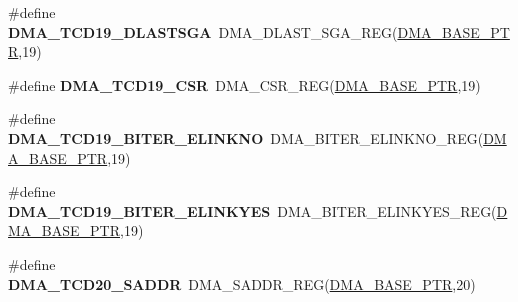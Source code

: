 \begin{DoxyCompactItemize}
\item 
\hypertarget{group___d_m_a___register___accessor___macros_gaef546aa07a3f2cf8190f304e29427477}{}\#define {\bfseries D\+M\+A\+\_\+\+T\+C\+D19\+\_\+\+D\+L\+A\+S\+T\+S\+G\+A}~D\+M\+A\+\_\+\+D\+L\+A\+S\+T\+\_\+\+S\+G\+A\+\_\+\+R\+E\+G(\hyperlink{group___d_m_a___peripheral_ga6997fbc1b1973e9f27170217a3bd6f22}{D\+M\+A\+\_\+\+B\+A\+S\+E\+\_\+\+P\+T\+R},19)\label{group___d_m_a___register___accessor___macros_gaef546aa07a3f2cf8190f304e29427477}

\item 
\hypertarget{group___d_m_a___register___accessor___macros_ga587a43ec991d2d01556bc6518886f92d}{}\#define {\bfseries D\+M\+A\+\_\+\+T\+C\+D19\+\_\+\+C\+S\+R}~D\+M\+A\+\_\+\+C\+S\+R\+\_\+\+R\+E\+G(\hyperlink{group___d_m_a___peripheral_ga6997fbc1b1973e9f27170217a3bd6f22}{D\+M\+A\+\_\+\+B\+A\+S\+E\+\_\+\+P\+T\+R},19)\label{group___d_m_a___register___accessor___macros_ga587a43ec991d2d01556bc6518886f92d}

\item 
\hypertarget{group___d_m_a___register___accessor___macros_gaa2f676b756e3847cfaea84b9b3f89f9d}{}\#define {\bfseries D\+M\+A\+\_\+\+T\+C\+D19\+\_\+\+B\+I\+T\+E\+R\+\_\+\+E\+L\+I\+N\+K\+N\+O}~D\+M\+A\+\_\+\+B\+I\+T\+E\+R\+\_\+\+E\+L\+I\+N\+K\+N\+O\+\_\+\+R\+E\+G(\hyperlink{group___d_m_a___peripheral_ga6997fbc1b1973e9f27170217a3bd6f22}{D\+M\+A\+\_\+\+B\+A\+S\+E\+\_\+\+P\+T\+R},19)\label{group___d_m_a___register___accessor___macros_gaa2f676b756e3847cfaea84b9b3f89f9d}

\item 
\hypertarget{group___d_m_a___register___accessor___macros_ga9a44cb006e77af05a3141fb2825aaf7a}{}\#define {\bfseries D\+M\+A\+\_\+\+T\+C\+D19\+\_\+\+B\+I\+T\+E\+R\+\_\+\+E\+L\+I\+N\+K\+Y\+E\+S}~D\+M\+A\+\_\+\+B\+I\+T\+E\+R\+\_\+\+E\+L\+I\+N\+K\+Y\+E\+S\+\_\+\+R\+E\+G(\hyperlink{group___d_m_a___peripheral_ga6997fbc1b1973e9f27170217a3bd6f22}{D\+M\+A\+\_\+\+B\+A\+S\+E\+\_\+\+P\+T\+R},19)\label{group___d_m_a___register___accessor___macros_ga9a44cb006e77af05a3141fb2825aaf7a}

\item 
\hypertarget{group___d_m_a___register___accessor___macros_gaad0650ef2f7096cffc19b2258c61cf1f}{}\#define {\bfseries D\+M\+A\+\_\+\+T\+C\+D20\+\_\+\+S\+A\+D\+D\+R}~D\+M\+A\+\_\+\+S\+A\+D\+D\+R\+\_\+\+R\+E\+G(\hyperlink{group___d_m_a___peripheral_ga6997fbc1b1973e9f27170217a3bd6f22}{D\+M\+A\+\_\+\+B\+A\+S\+E\+\_\+\+P\+T\+R},20)\label{group___d_m_a___register___accessor___macros_gaad0650ef2f7096cffc19b2258c61cf1f}


\end{DoxyCompactItemize}
